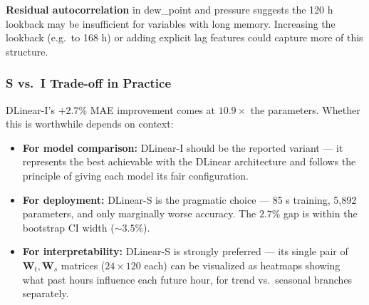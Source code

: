 \textbf{Residual autocorrelation} in dew\_point and pressure suggests the 120 h
lookback may be insufficient for variables with long memory. Increasing the
lookback (e.g.\ to 168 h) or adding explicit lag features could capture more of
this structure.

\subsubsection{S vs.\ I Trade-off in Practice}

DLinear-I's $+2.7\%$ MAE improvement comes at $10.9\times$ the parameters.
Whether this is worthwhile depends on context:

\begin{itemize}
  \item \textbf{For model comparison:} DLinear-I should be the reported variant
        --- it represents the best achievable with the DLinear architecture and
        follows the principle of giving each model its fair configuration.
  \item \textbf{For deployment:} DLinear-S is the pragmatic choice --- 85 s
        training, 5,892 parameters, and only marginally worse accuracy. The
        $2.7\%$ gap is within the bootstrap CI width ($\sim 3.5\%$).
  \item \textbf{For interpretability:} DLinear-S is strongly preferred --- its
        single pair of $\mathbf{W}_t, \mathbf{W}_s$ matrices ($24 \times 120$
        each) can be visualized as heatmaps showing what past hours influence
        each future hour, for trend vs.\ seasonal branches separately.
\end{itemize}
